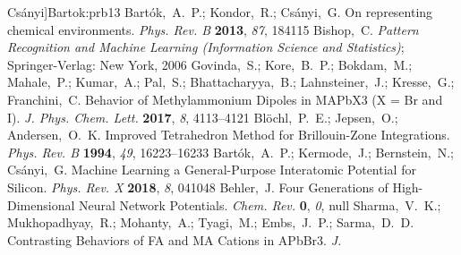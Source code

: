 \documentclass[journal=jpccck,manuscript=article,layout=twocolumn]{achemso}
\begin{document}
\begin{mcitethebibliography}{62}
  Cs\'anyi]{Bartok:prb13}
Bart\'ok,~A.~P.; Kondor,~R.; Cs\'anyi,~G. On representing chemical
  environments. \emph{Phys. Rev. B} \textbf{2013}, \emph{87}, 184115\relax
\mciteBstWouldAddEndPuncttrue
\mciteSetBstMidEndSepPunct{\mcitedefaultmidpunct}
{\mcitedefaultendpunct}{\mcitedefaultseppunct}\relax
\EndOfBibitem
{}
Bishop,~C. \emph{Pattern Recognition and Machine Learning (Information Science
  and Statistics)}; Springer-Verlag: New York, 2006\relax
\mciteBstWouldAddEndPuncttrue
\mciteSetBstMidEndSepPunct{\mcitedefaultmidpunct}
{\mcitedefaultendpunct}{\mcitedefaultseppunct}\relax
\EndOfBibitem
{}
Govinda,~S.; Kore,~B.~P.; Bokdam,~M.; Mahale,~P.; Kumar,~A.; Pal,~S.;
  Bhattacharyya,~B.; Lahnsteiner,~J.; Kresse,~G.; Franchini,~C. 
  Behavior of Methylammonium Dipoles in MAPbX3 (X = Br and I). \emph{J. Phys.
  Chem. Lett.} \textbf{2017}, \emph{8}, 4113--4121\relax
\mciteBstWouldAddEndPuncttrue
\mciteSetBstMidEndSepPunct{\mcitedefaultmidpunct}
{\mcitedefaultendpunct}{\mcitedefaultseppunct}\relax
\EndOfBibitem
{}
Bl{\"{o}}chl,~P.~E.; Jepsen,~O.; Andersen,~O.~K. Improved Tetrahedron Method
  for Brillouin-Zone Integrations. \emph{Phys. Rev. B} \textbf{1994},
  \emph{49}, 16223--16233\relax
\mciteBstWouldAddEndPuncttrue
\mciteSetBstMidEndSepPunct{\mcitedefaultmidpunct}
{\mcitedefaultendpunct}{\mcitedefaultseppunct}\relax
\EndOfBibitem
{}
Bart\'ok,~A.~P.; Kermode,~J.; Bernstein,~N.; Cs\'anyi,~G. Machine Learning a
  General-Purpose Interatomic Potential for Silicon. \emph{Phys. Rev. X}
  \textbf{2018}, \emph{8}, 041048\relax
\mciteBstWouldAddEndPuncttrue
\mciteSetBstMidEndSepPunct{\mcitedefaultmidpunct}
{\mcitedefaultendpunct}{\mcitedefaultseppunct}\relax
\EndOfBibitem
{}
Behler,~J. Four Generations of High-Dimensional Neural Network Potentials.
  \emph{Chem. Rev.} \textbf{0}, \emph{0}, null\relax
\mciteBstWouldAddEndPuncttrue
\mciteSetBstMidEndSepPunct{\mcitedefaultmidpunct}
{\mcitedefaultendpunct}{\mcitedefaultseppunct}\relax
\EndOfBibitem
{}
Sharma,~V.~K.; Mukhopadhyay,~R.; Mohanty,~A.; Tyagi,~M.; Embs,~J.~P.;
  Sarma,~D.~D. Contrasting Behaviors of FA and MA Cations in APbBr3. \emph{J.
}
\end{mcitethebibliography}
\end{document}

